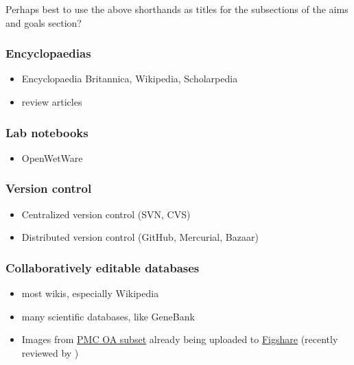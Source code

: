 \documentclass[final,authoryear,3p]{elsarticle-open-drafting}
\begin{document}
Perhaps best to use the above shorthands as titles for the subsections of the aims and goals section?
	
\subsubsection{Encyclopaedias}
\begin{itemize}
	\item Encyclopaedia Britannica, Wikipedia, Scholarpedia
	\item review articles
\end{itemize}

\subsubsection{Lab notebooks}
\begin{itemize}
	\item OpenWetWare
\end{itemize}

\subsubsection{Version control}
\begin{itemize}
	\item Centralized version control (SVN, CVS)
	\item Distributed version control (GitHub, Mercurial, Bazaar)
\end{itemize}

\subsubsection{Collaboratively editable databases}
\begin{itemize}
	\item most wikis, especially Wikipedia
	\item many scientific databases, like GeneBank
	\item Images from \href{http://www.ncbi.nlm.nih.gov/pmc/tools/openftlist/}{PMC OA subset} already being uploaded to \href{http://figshare.com/}{Figshare} (recently reviewed by \href{http://dx.doi.org/10.4103/0976-500X.81919}{\citep{singh2011f}})
\end{itemize}
\end{document}
